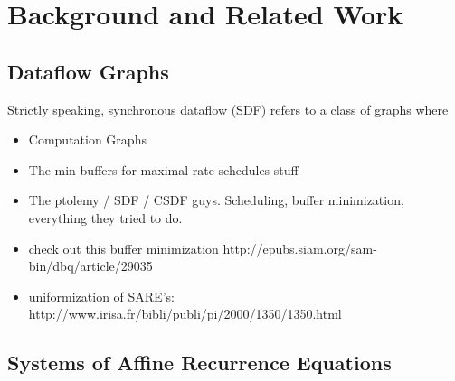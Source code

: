 \section{Background and Related Work}
\label{sec:related}

\subsection{Dataflow Graphs}

Strictly speaking, synchronous dataflow (SDF) refers to a class of
graphs where

\begin{itemize}

\item Computation Graphs

\item The min-buffers for maximal-rate schedules stuff

\item The ptolemy / SDF / CSDF guys.  Scheduling, buffer minimization,
everything they tried to do.

\item  check out this buffer minimization 
  http://epubs.siam.org/sam-bin/dbq/article/29035

\item uniformization of SARE's:
  http://www.irisa.fr/bibli/publi/pi/2000/1350/1350.html

\end{itemize}

\subsection{Systems of Affine Recurrence Equations}

